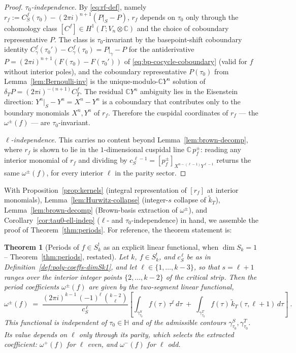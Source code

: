 \documentclass[11pt]{article}
\newtheorem{theorem}{Theorem}[section]
\numberwithin{equation}{section}  %
\newcommand{\HH}{\mathbb{H}}
\newcommand{\CC}{\mathbb{C}}
\begin{document}
\begin{proof}
\emph{$\tau_0$-independence.}  By \eqref{eq:rf-def}, namely
$r_f := C^f_S(\tau_0) - (2\pi i)^{n + 1}(P|_S - P)$,
$r_f$ depends on $\tau_0$ only through the cohomology class
$[C^f] \in H^1(\Gamma; V_n \otimes \CC)$ and the choice of coboundary
representative $P$.  The class is $\tau_0$-invariant by the
basepoint-shift coboundary identity
$C^f_\gamma(\tau_0') - C^f_\gamma(\tau_0) = P|_\gamma - P$ for the
antiderivative $P = (2\pi i)^{n + 1}(F(\tau_0) - F(\tau_0'))$ of
\eqref{eq:bp-cocycle-coboundary} (valid
for $f$ without interior poles), and the coboundary representative
$P(\tau_0)$ from Lemma~\ref{lem:Bernoulli-inv} is the
unique-modulo-$\CC Y^n$ solution of $\delta_T P = (2\pi i)^{-(n+1)} C^f_T$.
The residual $\CC Y^n$ ambiguity lies in the Eisenstein direction:
$Y^n|_S - Y^n = X^n - Y^n$ is a coboundary that contributes only to
the boundary monomials $X^n, Y^n$ of $r_f$.  Therefore the cuspidal
coordinates of $r_f$ --- the $\omega^\pm(f)$ --- are $\tau_0$-invariant.

\emph{$\ell$-independence.}  This carries no content beyond
Lemma~\ref{lem:brown-decomp}, where $r_f$ is shown to lie in the
$1$-dimensional cuspidal line $\CC\,p^\pm_f$: reading any interior
monomial of $r_f$ and dividing by
$c_S^{\,\ell - 1} = [p^\pm_f]_{X^{n - (\ell - 1)} Y^{\ell - 1}}$ returns
the same $\omega^\pm(f)$, for every interior $\ell$ in the parity sector.
\end{proof}

With Proposition~\ref{prop:kernels} (integral representation of
$[r_f]$ at interior monomials), Lemma~\ref{lem:Hurwitz-collapse}
(integer-$s$ collapse of $\widetilde{k}_T$), Lemma~\ref{lem:brown-decomp}
(Brown-basis extraction of $\omega^\pm$), and Corollary~\ref{cor:tau0-ell-indep}
($\ell$- and $\tau_0$-independence) in hand, we assemble the proof of
Theorem~\ref{thm:periods}.  For reference, the theorem statement is:

\begin{theorem}[Periods of $f \in S_k^!$ as an explicit linear functional, when $\dim S_k = 1$ -- Theorem~\ref{thm:periods}, restated]\label{thm:periods3}
Let $k$, $f \in S_k^!$, and $c_S^{\,\ell}$ be as in
Definition~\ref{def:poly-coeffs-dimSk1}, and let
$\ell \in \{1, \ldots, k - 3\}$, so that $s = \ell + 1$ ranges over the
interior integer points $\{2, \ldots, k-2\}$ of the critical strip.
Then the period coefficients $\omega^\pm(f)$ are given by the
two-segment linear functional,
\begin{equation}\label{eq:periods-statement-restated}
  \omega^\pm(f) \;=\; \frac{(2\pi i)^{k - 1}\,(-1)^{\ell}\,\binom{k - 2}{\ell}}{c_S^{\,\ell}}\!\left[
    \int_{\gamma^S_{\tau_0}}\!\! f(\tau)\,\tau^{\ell}\,d\tau
    \;+\;
    \int_{\gamma^T_{\tau_0}}\!\! f(\tau)\,\widetilde{k}_T(\tau, \ell + 1)\,d\tau
  \right]~.
\end{equation}
This functional is independent of $\tau_0 \in \HH$ and of the admissible
contours $\gamma^S_{\tau_0}, \gamma^T_{\tau_0}$.  Its value depends on
$\ell$ only through its parity, which selects the extracted coefficient:
$\omega^+(f)$ for $\ell$ even, and $\omega^-(f)$ for $\ell$ odd.
\end{theorem}
\end{document}
